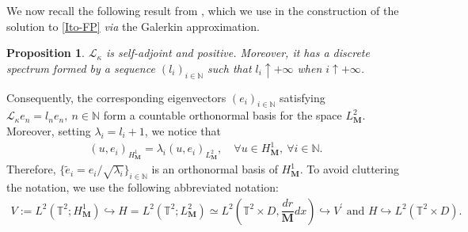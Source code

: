 \documentclass[a4paper,12pt, reqno]{amsart}
\newtheorem{proposition}[theorem]{Proposition}
\begin{document}
We now recall the following result from \cite[Proposition 3.6]{Masmoudi2008}, which we use in the construction of the solution to \eqref{Ito-FP} \textit{via} the Galerkin approximation.
\begin{proposition}\label{propo-construct-base}
$\mathcal{L}_\kappa$ is self-adjoint and positive. Moreover, it has a discrete spectrum formed by a sequence $(l_i)_{i\in \mathbb{N}}$ such that $l_i\uparrow +\infty$ when $i\uparrow +\infty$.
\end{proposition}
Consequently, the corresponding eigenvectors $(e_i)_{i\in \mathbb{N}}$ satisfying $\mathcal{L}_\kappa e_n=l_ne_n,\  n\in \mathbb{N}$ form  a countable orthonormal basis for the space $L^2_\mathbf{M}.$ Moreover, setting $\lambda_i=l_i+1$, we notice that
    \begin{align}\label{basis-eigen}
      (u,e_i)_{H^1_\mathbf{M}}=\lambda_i(u,e_i)_{L^2_\mathbf{M}}, \quad \forall u\in H^1_\mathbf{M}, \ \forall i\in \mathbb{N}.
    \end{align}
  Therefore,  $\{\tilde{e}_i=e_i/\sqrt{\lambda_i}\}_{i\in \mathbb{N}}$ is  an orthonormal basis of $H^1_\mathbf{M}.$ 
To avoid cluttering the notation, we use the following abbreviated notation:
\begin{align*}    
V:= L^2(\mathbb{T}^2;H^1_{\mathbf{M}})\hookrightarrow H=L^2(\mathbb{T}^2;L^2_\mathbf{M})\simeq  L^2(\mathbb{T}^2\times D, \dfrac{dr}{\mathbf{M}}dx) \hookrightarrow  V^\prime \text{ and } H\hookrightarrow  L^2(\mathbb{T}^2\times D).
\end{align*}
\end{document}
